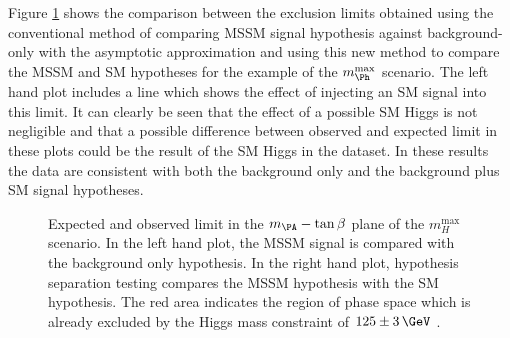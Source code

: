 Figure \ref{fig:hypotestcompare} shows the comparison between the exclusion
limits obtained using the conventional method of comparing \ac{MSSM} signal
hypothesis against background-only with the asymptotic approximation 
and using this new method to compare the
\ac{MSSM} and \ac{SM} hypotheses for the example of the $m_{\Ph}^\text{max}$
scenario. The left hand plot includes a line which shows
the effect of injecting an \ac{SM} signal into this limit. It can clearly be
seen that the effect of a possible \ac{SM} Higgs is not negligible and that a
possible difference between observed and expected limit in these plots could be 
the result of the \ac{SM} Higgs in the dataset. In these results the data are 
consistent with both the background only and the background plus \ac{SM} signal hypotheses.

\begin{figure}[tbh]
\caption[Expected and observed limit in the $m_{\PA}-\tan\beta$ plane of the
$m_H^{\text{max}}$ scenario.]{Expected and observed limit in the $m_{\PA}-\tan\beta$ plane of the
$m_H^{\text{max}}$ scenario. In the left hand plot, the \ac{MSSM} signal is
compared with the background only hypothesis. In the right hand plot, hypothesis
separation testing compares the \ac{MSSM} hypothesis with the \ac{SM}
hypothesis. The red area indicates the region of phase space which is already
excluded by the Higgs mass constraint of $125\pm3\,\GeV$ \cite{HIG-13-021-twiki,HIG-13-021}.}
\label{fig:hypotestcompare}
\end{figure}


